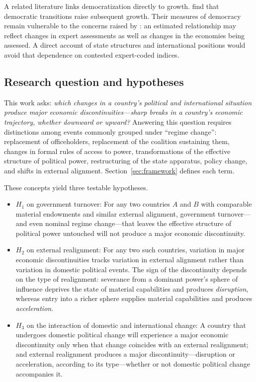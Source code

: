 \documentclass[11pt]{article}
\begin{document}
A related literature links democratization directly to growth. \textcite{acemoglu_naidu_restrepo_robinson_2019} find that democratic transitions raise subsequent growth. Their measures of democracy remain vulnerable to the concerns raised by \textcite{little_meng_2024}: an estimated relationship may reflect changes in expert assessments as well as changes in the economies being assessed. A direct account of state structures and international positions would avoid that dependence on contested expert-coded indices.

\subsection{Research question and hypotheses}

This work asks: \emph{which changes in a country's political and international situation produce major economic discontinuities---sharp breaks in a country's economic trajectory, whether downward or upward?} Answering this question requires distinctions among events commonly grouped under ``regime change'': replacement of officeholders, replacement of the coalition sustaining them, changes in formal rules of access to power, transformations of the effective structure of political power, restructuring of the state apparatus, policy change, and shifts in external alignment. Section~\ref{sec:framework} defines each term.

These concepts yield three testable hypotheses.

\begin{itemize}
    \item $H_1$ on government turnover: For any two countries $A$ and $B$ with comparable material endowments and similar external alignment, government turnover---and even nominal regime change---that leaves the effective structure of political power untouched will not produce a major economic discontinuity.
    \item $H_2$ on external realignment: For any two such countries, variation in major economic discontinuities tracks variation in external alignment rather than variation in domestic political events. The sign of the discontinuity depends on the type of realignment: severance from a dominant power's sphere of influence deprives the state of material capabilities and produces \emph{disruption}, whereas entry into a richer sphere supplies material capabilities and produces \emph{acceleration}.
    \item $H_3$ on the interaction of domestic and international change: A country that undergoes domestic political change will experience a major economic discontinuity only when that change coincides with an external realignment; and external realignment produces a major discontinuity---disruption or acceleration, according to its type---whether or not domestic political change accompanies it.
\end{itemize}
\end{document}
